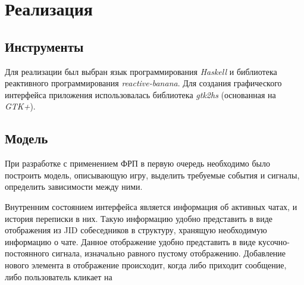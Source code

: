 \section{Реализация}
\subsection{Инструменты}
Для реализации был выбран язык программирования \emph{Haskell} и библиотека реактивного программирования \emph{reactive-banana}.
Для создания графического интерфейса приложения использовалась библиотека \emph{gtk2hs} (основанная на \emph{GTK+}).

\subsection{Модель}
При разработке с применением ФРП в первую очередь необходимо было построить модель, описывающую
игру, выделить требуемые события и сигналы, определить зависимости между ними.

Внутренним состоянием интерфейса является информация об активных чатах, и история переписки в них.
Такую информацию удобно представить в виде отображения из JID собеседников в структуру, хранящую необходимую информацию о чате.
Данное отображение удобно представить в виде кусочно-постоянного сигнала, изначально равного пустому отображению.
Добавление нового элемента в отображение происходит, когда либо приходит сообщение, либо пользователь кликает на

